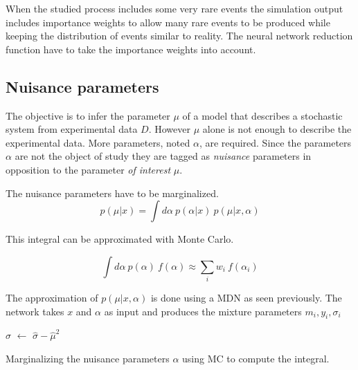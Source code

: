 When the studied process includes some very rare events the simulation output includes importance weights to allow many rare events to be produced while keeping the distribution of events similar to reality.
The neural network reduction function have to take the importance weights into account.



\subsection{Nuisance parameters}

The objective is to infer the parameter $\mu$ of a model that describes a stochastic system from experimental data $D$.
However $\mu$ alone is not enough to describe the experimental data.
More parameters, noted $\alpha$, are required.
Since the parameters $\alpha$ are not the object of study they are tagged as \emph{nuisance} parameters in opposition to the parameter \emph{of interest} $\mu$.

The nuisance parameters have to be marginalized.
\begin{equation}
    p(\mu | x) = \int d\alpha ~ p(\alpha | x) ~ p(\mu | x, \alpha)
\end{equation}

This integral can be approximated with Monte Carlo.

\begin{equation}
	\int d\alpha ~ p(\alpha) ~ f(\alpha)
	\approx \sum_i w_i ~ f(\alpha_i)
\end{equation}

The approximation of $p(\mu | x, \alpha)$ is done using a MDN as seen previously.
The network takes $x$ and $\alpha$ as input and produces the mixture parameters $m_i, y_i, \sigma_i$

\begin{algorithm}[H]
$\hat\sigma$  $\gets$ $\hat\sigma - \hat\mu^2$ \;
\caption{Marginalizing the nuisance parameters $\alpha$ using MC to compute the integral.}
\end{algorithm}



